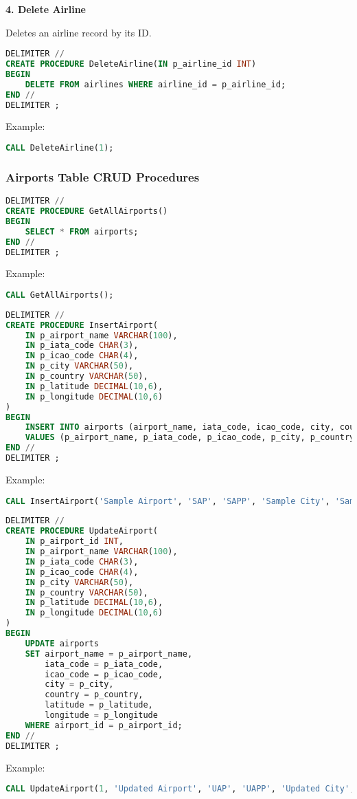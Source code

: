 \documentclass[a4paper,12pt]{article}
\begin{document}
\textbf{4. Delete Airline}

Deletes an airline record by its ID.
\begin{lstlisting}[language=SQL, caption=DeleteAirline Stored Procedure]
DELIMITER //
CREATE PROCEDURE DeleteAirline(IN p_airline_id INT)
BEGIN
    DELETE FROM airlines WHERE airline_id = p_airline_id;
END //
DELIMITER ;
\end{lstlisting}
Example:
\begin{lstlisting}[language=SQL]
CALL DeleteAirline(1);
\end{lstlisting}

\subsubsection{Airports Table CRUD Procedures}

\begin{lstlisting}[language=SQL, caption=GetAllAirports Stored Procedure]
DELIMITER //
CREATE PROCEDURE GetAllAirports()
BEGIN
    SELECT * FROM airports;
END //
DELIMITER ;
\end{lstlisting}
Example:
\begin{lstlisting}[language=SQL]
CALL GetAllAirports();
\end{lstlisting}

\begin{lstlisting}[language=SQL, caption=InsertAirport Stored Procedure]
DELIMITER //
CREATE PROCEDURE InsertAirport(
    IN p_airport_name VARCHAR(100),
    IN p_iata_code CHAR(3),
    IN p_icao_code CHAR(4),
    IN p_city VARCHAR(50),
    IN p_country VARCHAR(50),
    IN p_latitude DECIMAL(10,6),
    IN p_longitude DECIMAL(10,6)
)
BEGIN
    INSERT INTO airports (airport_name, iata_code, icao_code, city, country, latitude, longitude)
    VALUES (p_airport_name, p_iata_code, p_icao_code, p_city, p_country, p_latitude, p_longitude);
END //
DELIMITER ;
\end{lstlisting}
Example:
\begin{lstlisting}[language=SQL]
CALL InsertAirport('Sample Airport', 'SAP', 'SAPP', 'Sample City', 'Sample Country', 12.345678, 98.765432);
\end{lstlisting}

\begin{lstlisting}[language=SQL, caption=UpdateAirport Stored Procedure]
DELIMITER //
CREATE PROCEDURE UpdateAirport(
    IN p_airport_id INT,
    IN p_airport_name VARCHAR(100),
    IN p_iata_code CHAR(3),
    IN p_icao_code CHAR(4),
    IN p_city VARCHAR(50),
    IN p_country VARCHAR(50),
    IN p_latitude DECIMAL(10,6),
    IN p_longitude DECIMAL(10,6)
)
BEGIN
    UPDATE airports
    SET airport_name = p_airport_name,
        iata_code = p_iata_code,
        icao_code = p_icao_code,
        city = p_city,
        country = p_country,
        latitude = p_latitude,
        longitude = p_longitude
    WHERE airport_id = p_airport_id;
END //
DELIMITER ;
\end{lstlisting}
Example:
\begin{lstlisting}[language=SQL]
CALL UpdateAirport(1, 'Updated Airport', 'UAP', 'UAPP', 'Updated City', 'Updated Country', 11.111111, 22.222222);
\end{lstlisting}
\end{document}
